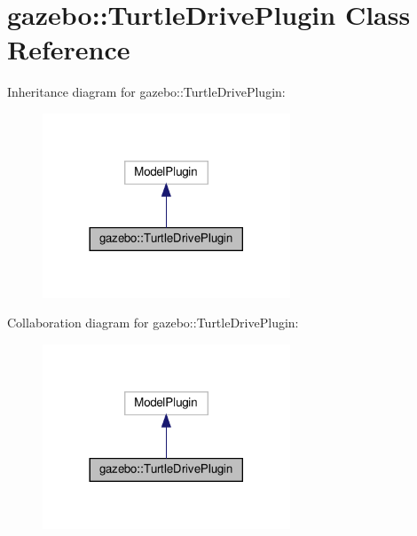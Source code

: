 \hypertarget{classgazebo_1_1TurtleDrivePlugin}{}\section{gazebo\+:\+:Turtle\+Drive\+Plugin Class Reference}
\label{classgazebo_1_1TurtleDrivePlugin}


Inheritance diagram for gazebo\+:\+:Turtle\+Drive\+Plugin\+:\nopagebreak
\begin{figure}[H]
\begin{center}
\leavevmode
\includegraphics[width=209pt]{d6/d21/classgazebo_1_1TurtleDrivePlugin__inherit__graph}
\end{center}
\end{figure}


Collaboration diagram for gazebo\+:\+:Turtle\+Drive\+Plugin\+:\nopagebreak
\begin{figure}[H]
\begin{center}
\leavevmode
\includegraphics[width=209pt]{da/d2c/classgazebo_1_1TurtleDrivePlugin__coll__graph}
\end{center}
\end{figure}
